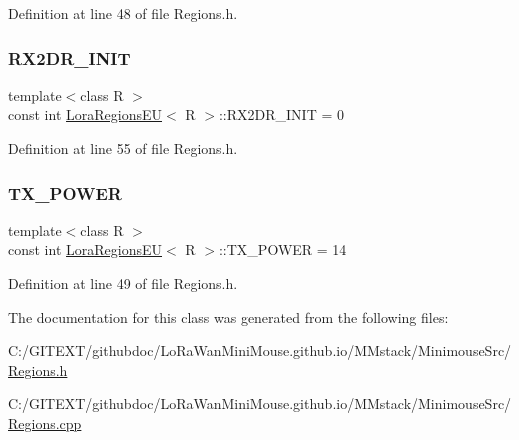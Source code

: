 Definition at line 48 of file Regions.\+h.

\mbox{\label{class_lora_regions_e_u_aab1f4fd427de20da11c75a1bb187504f}} 
\subsubsection{\texorpdfstring{R\+X2\+D\+R\+\_\+\+I\+N\+IT}{RX2DR\_INIT}}
{\footnotesize\ttfamily template$<$class R $>$ \\
const int \mbox{\hyperlink{class_lora_regions_e_u}{Lora\+Regions\+EU}}$<$ R $>$\+::R\+X2\+D\+R\+\_\+\+I\+N\+IT = 0\hspace{0.3cm}{\ttfamily [static]}}



Definition at line 55 of file Regions.\+h.

\mbox{\label{class_lora_regions_e_u_a534cd22621dc34cf64c82e76f19ab86c}} 
\subsubsection{\texorpdfstring{T\+X\+\_\+\+P\+O\+W\+ER}{TX\_POWER}}
{\footnotesize\ttfamily template$<$class R $>$ \\
const int \mbox{\hyperlink{class_lora_regions_e_u}{Lora\+Regions\+EU}}$<$ R $>$\+::T\+X\+\_\+\+P\+O\+W\+ER = 14\hspace{0.3cm}{\ttfamily [static]}}



Definition at line 49 of file Regions.\+h.



The documentation for this class was generated from the following files\+:\begin{DoxyCompactItemize}
\item 
C\+:/\+G\+I\+T\+E\+X\+T/githubdoc/\+Lo\+Ra\+Wan\+Mini\+Mouse.\+github.\+io/\+M\+Mstack/\+Minimouse\+Src/\mbox{\hyperlink{_regions_8h}{Regions.\+h}}\item 
C\+:/\+G\+I\+T\+E\+X\+T/githubdoc/\+Lo\+Ra\+Wan\+Mini\+Mouse.\+github.\+io/\+M\+Mstack/\+Minimouse\+Src/\mbox{\hyperlink{_regions_8cpp}{Regions.\+cpp}}\end{DoxyCompactItemize}
